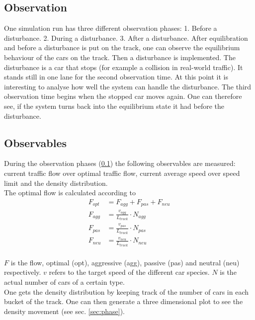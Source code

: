 \documentclass[11pt,a4paper,twocolumn]{article}
\begin{document}
\subsection{Observation} \label{subsec:observation}
One simulation run has three different observation phases: 1. Before a disturbance. 2. During a disturbance. 3. After a disturbance.
After equilibration and before a disturbance is put on the track, one can observe the equilibrium behaviour of the cars on the track. Then a disturbance is implemented. The disturbance is a car that stops (for example a collision in real-world traffic). It stands still in one lane for the second observation time. At this point it is interesting to analyse how well the system can handle the disturbance. The third observation time begins when the stopped car moves again. One can therefore see, if the system turns back into the equilibrium state it had before the disturbance. \\

\subsection{Observables} \label{subsec:observables}

During the observation phases (\ref{subsec:observation}) the following observables are measured: current traffic flow over optimal traffic flow, current average speed over speed limit and the density distribution. \\
The optimal flow is calculated according to
\begin{align*}
F_{opt} &= F_{agg} + F_{pas} + F_{neu} \\
F_{agg} &= \frac{v_{agg}}{L_{track}} \cdot N_{agg} \\
F_{pas} &= \frac{v_{pas}}{L_{track}} \cdot N_{pas} \\
F_{neu} &= \frac{v_{neu}}{L_{track}} \cdot N_{neu} \\
\end{align*}

$F$ is the flow, optimal (opt), aggressive (agg), passive (pas) and neutral (neu) respectively. $v$ refers to the target speed of the different car species. $N$ is the actual number of cars of a certain type.\\
One gets the density distribution by keeping track of the number of cars in each bucket of the track. One can then generate a three dimensional plot to see the density movement (see sec. \ref{sec:phase}).


\end{document}

